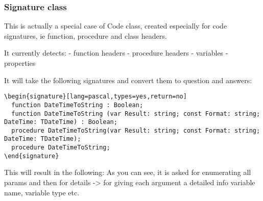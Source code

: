 \documentclass[a4paper,11pt]{article}
\begin{document}
\subsubsection{Signature class}
This is actually a special case of Code class, created especially for
code signatures, ie function, procedure and class headers.

It currently detects:
- function headers
- procedure headers
- variables
- properties

It will take the following signatures and convert them to question and answers:

\begin{verbatim}
\begin{signature}[lang=pascal,types=yes,return=no]
  function DateTimeToString : Boolean;
  function DateTimeToString (var Result: string; const Format: string; DateTime: TDateTime) : Boolean;
  procedure DateTimeToString(var Result: string; const Format: string; DateTime: TDateTime);
  procedure DateTimeToString;
\end{signature}
\end{verbatim}

This will result in the following:
As you can see, it is asked for enumerating all params  and then for details ->
for giving each argument a detailed info variable name, variable type etc.
\end{document}

